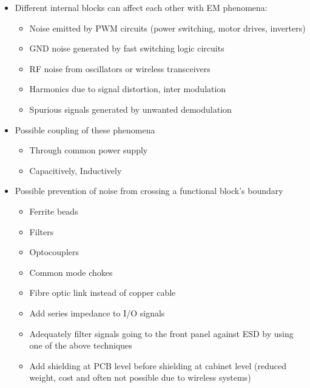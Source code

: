 	\begin{itemize}
		\item Different internal blocks can affect each other with EM phenomena: 
			\begin{itemize}
				\setlength{\itemsep}{-5pt}
				\item Noise emitted by PWM circuits (power switching, motor drives, inverters)
				\item GND noise generated by fast switching logic circuits
				\item RF noise from oscillators or wireless transceivers
				\item Harmonics due to signal distortion, inter modulation
				\item Spurious signals generated by unwanted demodulation
			\end{itemize}
		\item Possible coupling of these phenomena
			\begin{itemize}
				\setlength{\itemsep}{-5pt}
				\item Through common power supply
				\item Capacitively, Inductively
			\end{itemize}
		\item Possible prevention of noise from crossing a functional block's boundary
			\begin{itemize}
				\setlength{\itemsep}{-5pt}
				\item Ferrite beads
				\item Filters
				\item Optocouplers
				\item Common mode chokes
				\item Fibre optic link instead of copper cable
				\item Add series impedance to I/O signals
				\item Adequately filter signals going to the front panel against ESD by using one of the above techniques
				\item Add shielding at PCB level before shielding at cabinet level (reduced weight, cost and often not possible due to wireless systems)
			\end{itemize}
	\end{itemize}
